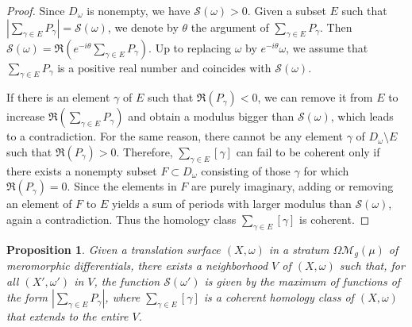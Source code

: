 \documentclass[11]{amsart}
\theoremstyle{plain}
\newtheorem{proposition}[theorem]{Proposition}
\theoremstyle{definition}
\begin{document}
\begin{proof}
Since $D_\omega$ is nonempty, we have $\mathcal{S}(\omega)>0$. Given a subset $E$ such that $\left|\sum\limits_{\gamma \in E} P_{\gamma} \right|= \mathcal{S}(\omega)$, we denote by $\theta$ the argument of $\sum\limits_{\gamma \in E} P_{\gamma}$. Then $\mathcal{S}(\omega)=\Re\left(e^{-i\theta}\sum\limits_{\gamma \in E} P_{\gamma} \right)$. Up to replacing $\omega$ by $e^{-i\theta}\omega$, we assume that $\sum\limits_{\gamma \in E} P_{\gamma}$ is a positive real number and coincides with $\mathcal{S}(\omega)$.

If there is an element $\gamma$ of $E$ such that $\Re(P_{\gamma})<0$, we can remove it from $E$ to increase $\Re\left(\sum\limits_{\gamma \in E} P_{\gamma} \right)$ and obtain a modulus bigger than $\mathcal{S}(\omega)$, which leads to a contradiction. For the same reason, there cannot be any element $\gamma$ of $D_{\omega} \setminus E$ such that $\Re(P_{\gamma})>0$. Therefore, $\sum\limits_{\gamma \in E} [\gamma]$ can fail to be coherent only if there exists a nonempty subset $F \subset D_{\omega}$ consisting of those $\gamma$ for which $\Re\left(P_{\gamma}\right)=0$. 
Since the elements in $F$ are purely imaginary, adding or removing an element of $F$ to $E$ yields a sum of periods with larger modulus than $\mathcal{S}(\omega)$, again a contradiction. Thus the homology class $\sum\limits_{\gamma \in E} [\gamma]$ is coherent. 
\end{proof}

\begin{proposition}\label{prop:PSFLocal}
Given a translation surface $(X,\omega)$ in a stratum $\Omega\mathcal M_g(\mu)$ of meromorphic differentials, there exists a neighborhood $V$ of $(X,\omega)$ such that, for all $(X', \omega')$ in $V$, the function $\mathcal{S}(\omega')$ is given by the maximum of functions of the form $\left|\sum\limits_{\gamma \in E} P_{\gamma} \right|$, where $\sum\limits_{\gamma \in E} [\gamma]$ is a coherent homology class of $(X,\omega)$ that extends to the entire $V$. 
\end{proposition}
\end{document}
